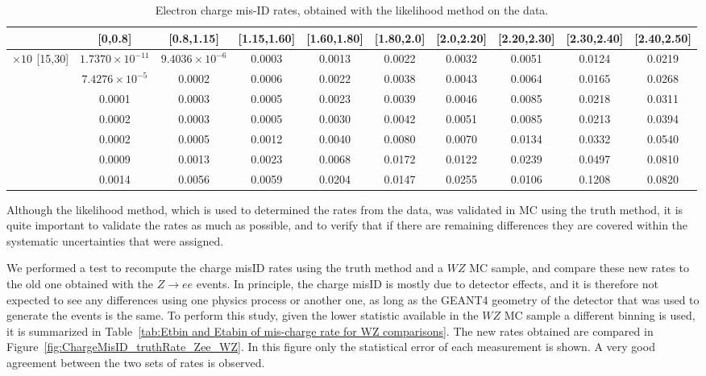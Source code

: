 \begin{table}
\footnotesize
\centering
\begin{tabular}{c|c|c|c|c|c|c|c|c|c}
  \hline
  \backslashbox{\pt[\GeV]}{$|$\eta$|$} &[0,0.8] &[0.8,1.15] &[1.15,1.60] &[1.60,1.80] &[1.80,2.0] &[2.0,2.20] &[2.20,2.30] &[2.30,2.40] &[2.40,2.50] \\
  \hline
  $ \times 10^{}$
  [15,30] &$1.7370\times 10^{-11}$ &$9.4036\times 10^{-6}$ &0.0003 &0.0013 &0.0022 &0.0032 &0.0051 &0.0124 &0.0219\\
  \hline
  [30,40] &$7.4276\times 10^{-5}$ &0.0002 &0.0006 &0.0022 &0.0038 &0.0043 &0.0064 &0.0165 &0.0268 \\
  \hline
  [40,50] &0.0001 &0.0003 &0.0005 &0.0023 &0.0039 &0.0046 &0.0085 &0.0218 &0.0311 \\
  \hline
  [50,60] &0.0002 &0.0003 &0.0005 &0.0030 &0.0042 &0.0051 &0.0085 &0.0213 &0.0394 \\
  \hline
  [60,80] &0.0002 &0.0005 &0.0012 &0.0040 &0.0080 &0.0070 &0.0134 &0.0332 &0.0540 \\
  \hline
  [80,120] &0.0009 &0.0013 &0.0023 &0.0068 &0.0172 &0.0122 &0.0239 &0.0497 &0.0810 \\
  \hline
  [120,1000] &0.0014 &0.0056 &0.0059 &0.0204 &0.0147 &0.0255 &0.0106 &0.1208 &0.0820  \\
  \hline
\end{tabular}
\caption{Electron charge mis-ID rates, obtained with the likelihood method on the data.}
\label{tab:LL_finalRates}
\end{table}




Although the likelihood method, which is used to determined the rates from the data, was validated in MC using the truth method, it is quite important to validate the rates as much as possible, and to verify that if there are remaining differences they are covered within the systematic uncertainties that were assigned.


We performed a test to recompute the charge misID rates using the truth method and a $WZ$ MC sample, and compare these new rates to the old one obtained with the $Z\to{}ee$ events. In principle, the charge misID is mostly due to detector effects, and it is therefore not expected to see any differences using one physics process or another one, as long as the GEANT4 geometry of the detector that was used to generate the events is the same. To perform this study, given the lower statistic available in the $WZ$ MC sample a different binning is used, it is summarized in Table~\ref{tab:Etbin and Etabin of mis-charge rate for WZ comparisons}. The new rates obtained are compared in Figure~\ref{fig:ChargeMisID_truthRate_Zee_WZ}. In this figure only the statistical error of each measurement is shown. A very good agreement between the two sets of rates is observed.



